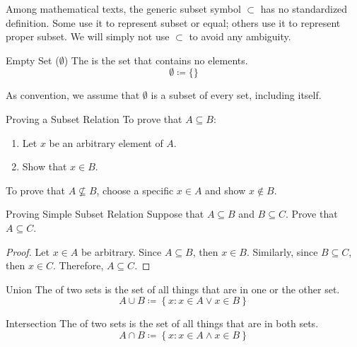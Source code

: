 \begin{notebox}
    Among mathematical texts, the generic subset symbol $\subset$ has no standardized definition. Some use it to represent subset or equal; others use it to represent proper subset. We will simply not use $\subset$ to avoid any ambiguity.
\end{notebox}

\begin{dfnbox}{Empty Set ($\emptyset$)}{}
    The  is the set that contains no elements.
    \tcblower
    \[ \emptyset \coloneq \{ \} \]
\end{dfnbox}

As convention, we assume that $\emptyset$ is a subset of every set, including itself.


\begin{tecbox}{Proving a Subset Relation}{}
    To prove that $A \subseteq B$:
    \begin{enumerate}
        \item Let $x$ be an arbitrary element of $A$.
        \item Show that $x \in B$.
    \end{enumerate}
    \tcblower
    To prove that $A \not\subseteq B$, choose a specific $x \in A$ and show $x \notin B$.
\end{tecbox}

\begin{exbox}{Proving Simple Subset Relation}{}
    Suppose that $A \subseteq B$ and $B \subseteq C$. Prove that $A \subseteq C$.
    \tcblower
    \begin{proof}
        Let $x \in A$ be arbitrary. Since $A \subseteq B$, then $x \in B$. Similarly, since $B \subseteq C$, then $x \in C$. Therefore, $A \subseteq C$.
    \end{proof}
\end{exbox}

\begin{dfnbox}{Union}{}
    The  of two sets is the set of all things that are in one or the other set.
    \tcblower
    \[ A \cup B \coloneq \left\{ x : x \in A \lor x \in B \right\} \]
\end{dfnbox}

\begin{dfnbox}{Intersection}{}
    The  of two sets is the set of all things that are in both sets.
    \tcblower
    \[ A \cap B \coloneq \left\{ x : x \in A \land x \in B \right\} \]
\end{dfnbox}

